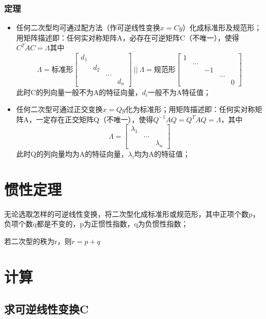 \subsubsection{定理}
\begin{itemize}
    \item 任何二次型均可通过配方法（作可逆线性变换\(x = Cy\)）化成标准形及规范形；用矩阵描述即：任何实对称矩阵A，必存在可逆矩阵C（不唯一），使得\(C^TAC = \Lambda\)其中\[\Lambda = \text{标准形}\begin{bmatrix}
        d_1 \\ 
        & d_2 \\ 
        & & ... \\ 
        & & & d_n
    \end{bmatrix}\ ||\ \Lambda = \text{规范形}\begin{bmatrix}
        1 \\ 
        & ... \\ 
        & & -1 \\ 
        & & & ... \\ 
        & & & & 0
    \end{bmatrix}\]
    此时C的列向量一般不为A的特征向量，\(d_i\)一般不为A特征值；
    \item 任何二次型可通过正交变换\(x = Qy\)化为标准形；用矩阵描述即：任何实对称矩阵A，一定存在正交矩阵Q（不唯一），使得\(Q^{-1}AQ = Q^TAQ = \Lambda\)，其中\[\Lambda = \begin{bmatrix}
        \lambda_1 \\ 
        & ... \\ 
        & & \lambda_n
    \end{bmatrix}\]
    此时Q的列向量均为A的特征向量，\(\lambda_i\)均为A的特征值；
\end{itemize}


\section{惯性定理}
无论选取怎样的可逆线性变换，将二次型化成标准形或规范形，其中正项个数p，负项个数q都是不变的，p为正惯性指数，q为负惯性指数；

若二次型的秩为r，则\(r = p + q\)




\section{计算}

\subsection{求可逆线性变换C}

